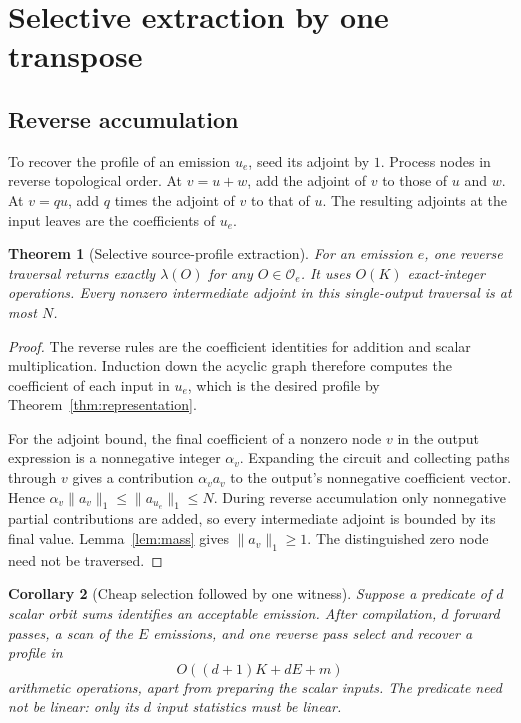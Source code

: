 \documentclass[11pt]{article}
\newtheorem{theorem}{Theorem}[section]
\newtheorem{corollary}[theorem]{Corollary}
\theoremstyle{definition}\newtheorem{definition}[theorem]{Definition}
\theoremstyle{remark}\newtheorem{remark}[theorem]{Remark}
\newcommand{\orbits}{\mathcal O}
\begin{document}
\section{Selective extraction by one transpose}
\label{sec:transpose}

\subsection{Reverse accumulation}
To recover the profile of an emission $u_e$, seed its adjoint by $1$. Process
nodes in reverse topological order. At $v=u+w$, add the adjoint of $v$ to those
of $u$ and $w$. At $v=qu$, add $q$ times the adjoint of $v$ to that of $u$.
The resulting adjoints at the input leaves are the coefficients of $u_e$.

\begin{theorem}[Selective source-profile extraction]
\label{thm:transpose}
For an emission $e$, one reverse traversal returns exactly $\lambda(O)$ for
any $O\in\orbits_e$. It uses $O(K)$ exact-integer operations. Every nonzero
intermediate adjoint in this single-output traversal is at most $N$.
\end{theorem}
\begin{proof}
The reverse rules are the coefficient identities for addition and scalar
multiplication. Induction down the acyclic graph therefore computes the
coefficient of each input in $u_e$, which is the desired profile by
Theorem~\ref{thm:representation}.

For the adjoint bound, the final coefficient of a nonzero node $v$ in the output
expression is a nonnegative integer $\alpha_v$. Expanding the circuit and
collecting paths through $v$ gives a contribution $\alpha_v a_v$ to the output's
nonnegative coefficient vector. Hence
$\alpha_v\|a_v\|_1\le\|a_{u_e}\|_1\le N$.
During reverse accumulation only nonnegative partial contributions are added,
so every intermediate adjoint is bounded by its final value. Lemma~\ref{lem:mass}
gives $\|a_v\|_1\ge1$. The distinguished zero node need not be traversed.
\end{proof}

\begin{corollary}[Cheap selection followed by one witness]
Suppose a predicate of $d$ scalar orbit sums identifies an acceptable emission.
After compilation, $d$ forward passes, a scan of the $E$ emissions, and one
reverse pass select and recover a profile in
\[
 O((d+1)K+dE+m)
\]
arithmetic operations, apart from preparing the scalar inputs. The predicate
need not be linear: only its $d$ input statistics must be linear.
\end{corollary}
\end{document}
